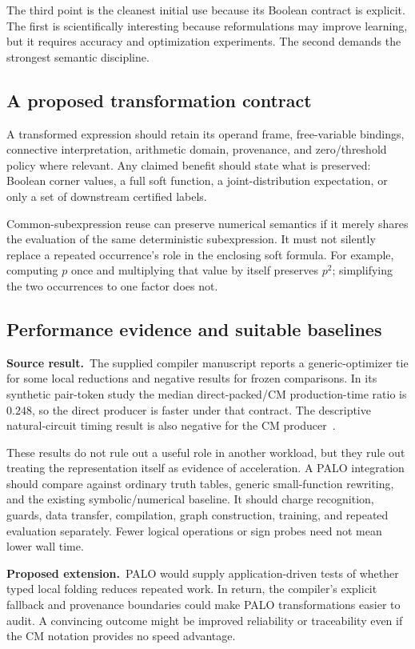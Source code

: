 \documentclass[11pt,a4paper]{article}
\theoremstyle{remark}
\newcommand{\sourceclaim}{\textbf{Source result.}\ }
\newcommand{\proposal}{\textbf{Proposed extension.}\ }
\begin{document}
The third point is the cleanest initial use because its Boolean contract is explicit. The first is scientifically interesting because reformulations may improve learning, but it requires accuracy and optimization experiments. The second demands the strongest semantic discipline.

\subsection{A proposed transformation contract}
A transformed expression should retain its operand frame, free-variable bindings, connective interpretation, arithmetic domain, provenance, and zero/threshold policy where relevant. Any claimed benefit should state what is preserved: Boolean corner values, a full soft function, a joint-distribution expectation, or only a set of downstream certified labels.

Common-subexpression reuse can preserve numerical semantics if it merely shares the evaluation of the same deterministic subexpression. It must not silently replace a repeated occurrence's role in the enclosing soft formula. For example, computing $p$ once and multiplying that value by itself preserves $p^2$; simplifying the two occurrences to one factor does not.

\subsection{Performance evidence and suitable baselines}
\sourceclaim The supplied compiler manuscript reports a generic-optimizer tie for some local reductions and negative results for frozen comparisons. In its synthetic pair-token study the median direct-packed/CM production-time ratio is $0.248$, so the direct producer is faster under that contract. The descriptive natural-circuit timing result is also negative for the CM producer~\cite[Section 8]{compiler}.

These results do not rule out a useful role in another workload, but they rule out treating the representation itself as evidence of acceleration. A PALO integration should compare against ordinary truth tables, generic small-function rewriting, and the existing symbolic/numerical baseline. It should charge recognition, guards, data transfer, compilation, graph construction, training, and repeated evaluation separately. Fewer logical operations or sign probes need not mean lower wall time.

\proposal PALO would supply application-driven tests of whether typed local folding reduces repeated work. In return, the compiler's explicit fallback and provenance boundaries could make PALO transformations easier to audit. A convincing outcome might be improved reliability or traceability even if the CM notation provides no speed advantage.
\end{document}
